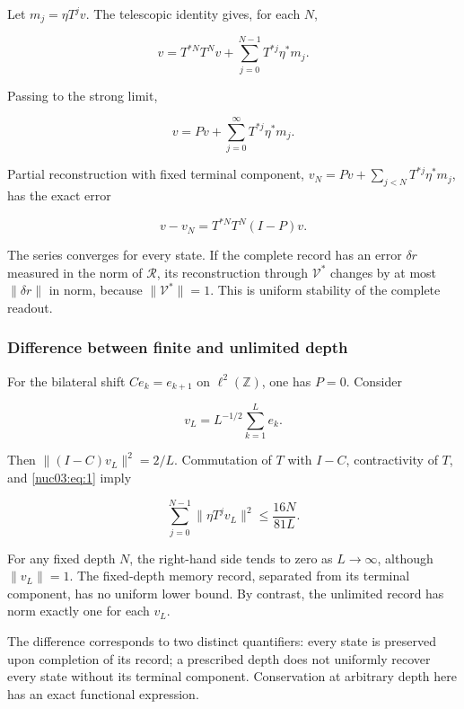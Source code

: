 Let \(m_j=\eta T^jv\). The telescopic identity gives, for each \(N\),

\begin{equation}
\boxed{v=T^{*N}T^Nv+\sum_{j=0}^{N-1}T^{*j}\eta^*m_j.}
\label{nuc03:eq:8}
\end{equation}

Passing to the strong limit,

\begin{equation}
\boxed{v=Pv+\sum_{j=0}^{\infty}T^{*j}\eta^*m_j.}
\label{nuc03:eq:9}
\end{equation}

Partial reconstruction with fixed terminal component,
\(v_N=Pv+\sum_{j<N}T^{*j}\eta^*m_j\), has the exact error

\begin{equation}
v-v_N=T^{*N}T^N(I-P)v.
\label{nuc03:eq:10}
\end{equation}

The series converges for every state. If the complete record has an error \(\delta r\) measured in the norm of \(\mathcal R\), its reconstruction through \(\mathcal V^*\) changes by at most \(\|\delta r\|\) in norm, because \(\|\mathcal V^*\|=1\). This is uniform stability of the complete readout.

\subsubsection{Difference between finite and unlimited depth}

For the bilateral shift \(Ce_k=e_{k+1}\) on \(\ell^2(\mathbb Z)\), one has \(P=0\). Consider

\[
v_L=L^{-1/2}\sum_{k=1}^{L}e_k.
\]

Then \(\|(I-C)v_L\|^2=2/L\). Commutation of \(T\) with \(I-C\), contractivity of \(T\), and \eqref{nuc03:eq:1} imply

\begin{equation}
\sum_{j=0}^{N-1}\|\eta T^jv_L\|^2
\leq\frac{16N}{81L}.
\label{nuc03:eq:11}
\end{equation}

For any fixed depth \(N\), the right-hand side tends to zero as \(L\to\infty\), although \(\|v_L\|=1\). The fixed-depth memory record, separated from its terminal component, has no uniform lower bound. By contrast, the unlimited record has norm exactly one for each \(v_L\).

The difference corresponds to two distinct quantifiers: every state is preserved upon completion of its record; a prescribed depth does not uniformly recover every state without its terminal component. Conservation at arbitrary depth here has an exact functional expression.

